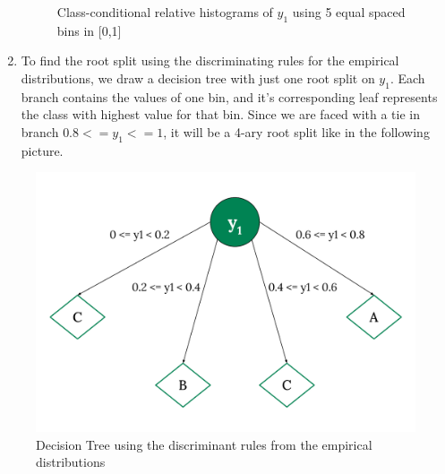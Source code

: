 \documentclass[12pt]{article}
\begin{document}
\begin{enumerate}
\begin{figure}[ht]
    \vspace{0.5cm} 

    \begin{minipage}[t]{0.48\linewidth}
        \centering
    \end{minipage}
    
    \caption{Class-conditional relative histograms of $y_1$ using 5 equal spaced bins in [0,1]}
\end{figure}

\vspace{15cm}

\item To find the root split using the discriminating rules for the empirical distributions, we draw a decision tree with just one root split on $y_1$.
Each branch contains the values of one bin, and it's corresponding leaf represents the class with highest value for that bin.
Since we are faced with a tie in branch $0.8 <= y_1 <= 1$, it will be a 4-ary root split like in the following picture.
\end{enumerate}

\begin{figure}[H]
    \centering
    \includegraphics[width=12cm]{./Part I/4-ary root split.pdf}
    \caption{Decision Tree using the discriminant rules from the empirical distributions}
\end{figure}
\end{document}
